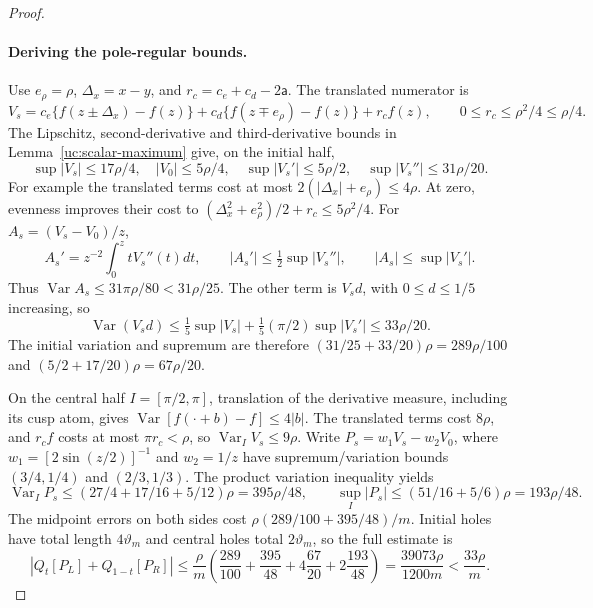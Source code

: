 \begin{proof}
\paragraph{Deriving the pole-regular bounds.}
Use $e_\rho=\rho$, $\Delta_x=x-y$, and $r_c=c_e+c_d-2\mathsf a$.
The translated numerator is
\[
 V_s=c_e\{f(z\pm\Delta_x)-f(z)\}
       +c_d\{f(z\mp e_\rho)-f(z)\}+r_cf(z),\qquad
 0\leq r_c\leq\rho^2/4\leq\rho/4.
\]
The Lipschitz, second-derivative and third-derivative bounds in
Lemma~\ref{uc:scalar-maximum} give, on the initial half,
\[
 \sup|V_s|\leq17\rho/4,\quad |V_0|\leq5\rho/4,\quad
 \sup|V_s'|\leq5\rho/2,\quad \sup|V_s''|\leq31\rho/20.
\]
For example the translated terms cost at most
$2(|\Delta_x|+e_\rho)\leq4\rho$. At zero, evenness improves their cost to
$(\Delta_x^2+e_\rho^2)/2+r_c\leq5\rho^2/4$.
For $A_s=(V_s-V_0)/z$,
\[
 A_s'=z^{-2}\int_0^z tV_s''(t)dt,\qquad
 |A_s'|\leq\tfrac12\sup|V_s''|,\qquad |A_s|\leq\sup|V_s'|.
\]
Thus $\operatorname{Var}A_s\leq31\pi\rho/80<31\rho/25$.
The other term is $V_sd$, with $0\leq d\leq1/5$ increasing, so
\[
 \operatorname{Var}(V_sd)\leq\tfrac15\sup|V_s|
       +\tfrac15(\pi/2)\sup|V_s'|\leq33\rho/20.
\]
The initial variation and supremum are therefore
$(31/25+33/20)\rho=289\rho/100$ and
$(5/2+17/20)\rho=67\rho/20$.

On the central half $I=[\pi/2,\pi]$, translation of the derivative
measure, including its cusp atom, gives
$\operatorname{Var}[f(\cdot+b)-f]\leq4|b|$.
The translated terms cost $8\rho$, and $r_cf$ costs at most
$\pi r_c<\rho$, so $\operatorname{Var}_I V_s\leq9\rho$.
Write $P_s=w_1V_s-w_2V_0$, where
$w_1=[2\sin(z/2)]^{-1}$ and $w_2=1/z$ have
supremum/variation bounds $(3/4,1/4)$ and $(2/3,1/3)$.
The product variation inequality yields
\[
 \operatorname{Var}_IP_s\leq
 (27/4+17/16+5/12)\rho=395\rho/48,\qquad
 \sup_I|P_s|\leq(51/16+5/6)\rho=193\rho/48.
\]
The midpoint errors on both sides cost
$\rho(289/100+395/48)/m$. Initial holes have total length $4\vartheta_m$
and central holes total $2\vartheta_m$, so the full estimate is
\[
 |Q_t[P_L]+Q_{1-t}[P_R]|\leq\frac\rho m
 \left(\frac{289}{100}+\frac{395}{48}
       +4\frac{67}{20}+2\frac{193}{48}\right)
 =\frac{39073\rho}{1200m}<\frac{33\rho}m.
\]


\end{proof}
